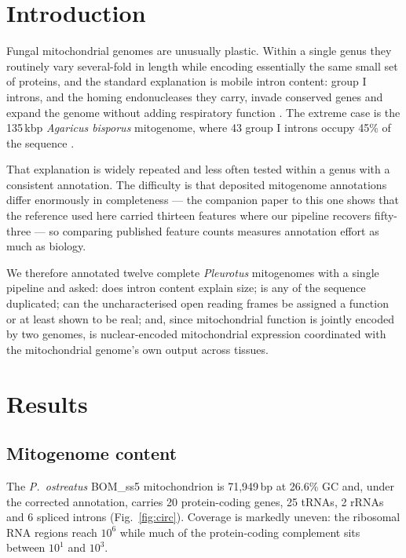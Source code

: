 \section{Introduction}

Fungal mitochondrial genomes are unusually plastic. Within a single genus they routinely vary
several-fold in length while encoding essentially the same small set of proteins, and the
standard explanation is mobile intron content: group I introns, and the homing endonucleases
they carry, invade conserved genes and expand the genome without adding respiratory function
\cite{sandor2018fungalmito}. The extreme case is the 135\,kbp \textit{Agaricus bisporus}
mitogenome, where 43 group I introns occupy 45\% of the sequence
\cite{ferandon2013agaricus}.

That explanation is widely repeated and less often tested within a genus with a consistent
annotation. The difficulty is that deposited mitogenome annotations differ enormously in
completeness --- the companion paper to this one shows that the reference used here carried
thirteen features where our pipeline recovers fifty-three --- so comparing published feature
counts measures annotation effort as much as biology.

We therefore annotated twelve complete \textit{Pleurotus} mitogenomes with a single pipeline
and asked: does intron content explain size; is any of the sequence duplicated; can the
uncharacterised open reading frames be assigned a function or at least shown to be real; and,
since mitochondrial function is jointly encoded by two genomes, is nuclear-encoded
mitochondrial expression coordinated with the mitochondrial genome's own output across tissues.

\section{Results}

\subsection{Mitogenome content}

The \textit{P.\ ostreatus} BOM\_ss5 mitochondrion is 71,949\,bp at 26.6\% GC and, under the
corrected annotation, carries 20 protein-coding genes, 25 tRNAs, 2 rRNAs and 6 spliced introns
(Fig.~\ref{fig:circ}). Coverage is markedly uneven: the ribosomal RNA regions reach $10^6$
while much of the protein-coding complement sits between $10^1$ and $10^3$.

